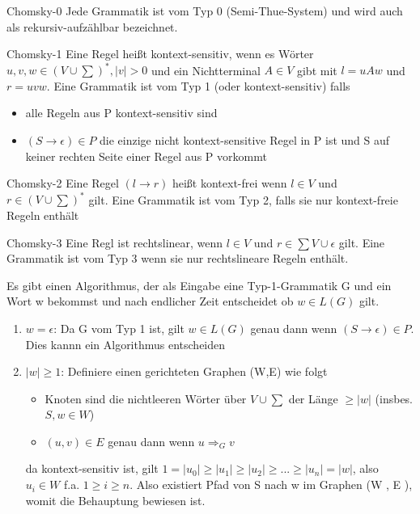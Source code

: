 \documentclass[avery5371]{flashcards}
\begin{document}
\begin{flashcard}[Definition]{Chomsky-0}
    Jede Grammatik ist vom Typ 0 (Semi-Thue-System) und wird auch als rekursiv-aufzählbar bezeichnet.
\end{flashcard}

\begin{flashcard}[Definition]{Chomsky-1}
    Eine Regel heißt kontext-sensitiv, wenn es Wörter $u,v,w\in(V\cup\sum)^*,|v|>0$ und ein Nichtterminal $A\in V$ gibt mit $l=uAw$ und $r=uvw$. Eine Grammatik ist vom Typ 1 (oder kontext-sensitiv) falls
    \begin{itemize}
        \item alle Regeln aus P kontext-sensitiv sind
        \item $(S\rightarrow \epsilon)\in P$ die einzige nicht kontext-sensitive Regel in P ist und S auf keiner rechten Seite einer Regel aus P vorkommt
    \end{itemize}
\end{flashcard}

\begin{flashcard}[Definition]{Chomsky-2}
    Eine Regel $(l\rightarrow r)$ heißt kontext-frei wenn $l\in V$ und $r\in (V\cup \sum)^*$ gilt. Eine Grammatik ist vom Typ 2, falls sie nur kontext-freie Regeln enthält
\end{flashcard}

\begin{flashcard}[Definition]{Chomsky-3}
    Eine Regl ist rechtslinear, wenn $l\in V$ und $r\in \sum V\cup {\epsilon}$ gilt. Eine Grammatik ist vom Typ 3 wenn sie nur rechtslineare Regeln enthält.
\end{flashcard}

\begin{flashcard}[Beweise]{Es gibt einen Algorithmus, der als Eingabe eine Typ-1-Grammatik G und ein Wort w bekommst und nach endlicher Zeit entscheidet ob $w\in L(G)$ gilt.}
    \scriptsize{
    \begin{enumerate}
        \item $w=\epsilon$: Da G vom Typ 1 ist, gilt $w\in L(G)$ genau dann wenn $(S\rightarrow \epsilon)\in P$. Dies kannn ein Algorithmus entscheiden
        \item $|w|\geq 1$: Definiere einen gerichteten Graphen (W,E) wie folgt
        \begin{itemize}
            \item Knoten sind die nichtleeren Wörter über $V\cup\sum$ der Länge $\geq|w|$ (insbes. $S,w \in W$)
            \item $(u,v)\in E$ genau dann wenn $u\Rightarrow_G v$
        \end{itemize}
        da kontext-sensitiv ist, gilt $1 = |u_0|\geq |u_1|\geq |u_2|\geq...\geq |u_n| = |w|$, also $u_i\in W$  f.a. $1\geq i \geq n$. Also existiert Pfad von S nach w im Graphen (W , E ), womit die Behauptung bewiesen ist.
    \end{enumerate}
    }
\end{flashcard}
\end{document}
